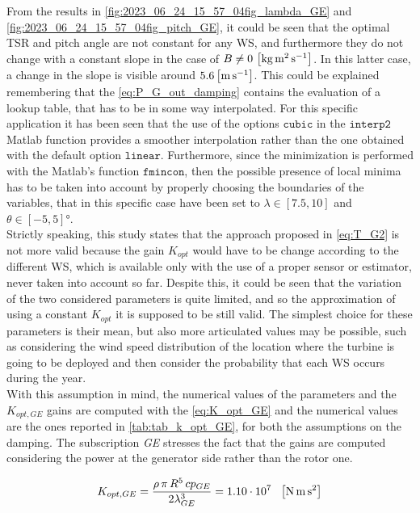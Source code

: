 From the results in \autoref{fig:2023_06_24_15_57_04fig_lambda_GE} and \ref{fig:2023_06_24_15_57_04fig_pitch_GE}, it could be seen that the optimal TSR and pitch angle are not constant for any WS, and furthermore they do not change with a constant slope in the case of $B\neq0 \, \left[\si{\kilo\gram\square\meter\per\second}\right]$. In this latter case, a change in the slope is visible around $5.6 \left[\si{\meter \per\second}\right]$. This could be explained remembering that the \autoref{eq:P_G_out_damping} contains the evaluation of a lookup table, that has to be in some way interpolated. For this specific application it has been seen that the use of the options $\texttt{cubic}$ in the $\texttt{interp2}$ Matlab function provides a smoother interpolation rather than the one obtained with the default option $\texttt{linear}$. Furthermore, since the minimization is performed with the Matlab's function $\texttt{fmincon}$, then the possible presence of local minima has to be taken into account by properly choosing the boundaries of the variables, that in this specific case have been set to $\lambda \in \left[7.5, 10\right]$ and $\theta\in\left[-5, 5\right] \si{\degree}$.  \\
Strictly speaking, this study states that the approach proposed in \autoref{eq:T_G2} is not more valid because the gain $K_{opt}$ would have to be change according to the different WS, which is available only with the use of a proper sensor or estimator, never taken into account so far. Despite this, it could be seen that the variation of the two considered parameters is quite limited, and so the approximation of using a constant $K_{opt}$ it is supposed to be still valid. The simplest choice for these parameters is their mean, but also more articulated values may be possible, such as considering the wind speed distribution of the location where the turbine is going to be deployed and then consider the probability that each WS occurs during the year.\\
With this assumption in mind, the numerical values of the parameters and the $K_{opt,GE}$ gains are computed with the \autoref{eq:K_opt_GE} and the numerical values are the ones reported in \autoref{tab:tab_k_opt_GE}, for both the assumptions on the damping. The subscription \textit{GE} stresses the fact that the gains are computed considering the power at the generator side rather than the rotor one.

\begin{equation}
  K_{opt,GE} = \frac{\rho \, \pi \, R^5 \, cp_{GE}}{2\lambda_{GE}^3} = 1.10\cdot10^7 \ \ \mesunt{\newton\meter\square\second}
  \label{eq:K_opt_GE}
\end{equation}

